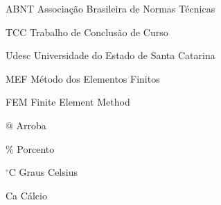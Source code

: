 
\listoffigures*
\cleardoublepage



\listoftables*
\cleardoublepage

\begin{siglas}
	\item[ABNT] Associação Brasileira de Normas Técnicas
	\item[TCC] Trabalho de Conclusão de Curso
	\item[Udesc] Universidade do Estado de Santa Catarina
	\item[MEF] Método dos Elementos Finitos
	\item[FEM] Finite Element Method 
\end{siglas}



\begin{simbolos}
  \item[@] Arroba
  \item[\%] Porcento
  \item[$^\circ$C] Graus Celsius
  \item[Ca] Cálcio
\end{simbolos}

